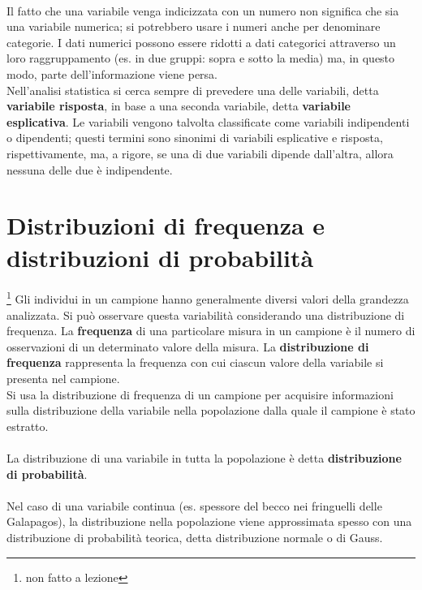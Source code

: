 \documentclass[10pt, draft]{book}
\begin{document}
\\
Il fatto che una variabile venga indicizzata con un numero non significa che sia una variabile numerica; si potrebbero usare i numeri anche per denominare categorie. I dati numerici possono essere ridotti a dati categorici attraverso un loro raggruppamento (es. in due gruppi: sopra e sotto la media) ma, in questo modo, parte dell'informazione viene persa.
\\
Nell'analisi statistica si cerca sempre di prevedere una delle variabili, detta \textbf{variabile risposta}, in base a una seconda variabile, detta \textbf{variabile esplicativa}. Le variabili vengono talvolta classificate come variabili indipendenti o dipendenti; questi termini sono sinonimi di variabili esplicative e risposta, rispettivamente, ma, a rigore, se una di due variabili dipende dall'altra, allora nessuna delle due è indipendente.
\clearpage
\section{Distribuzioni di frequenza e distribuzioni di probabilità}\footnote{non fatto a lezione}
Gli individui in un campione hanno generalmente diversi valori della grandezza analizzata. Si può osservare questa variabilità considerando una distribuzione di frequenza. La \textbf{frequenza} di una particolare misura in un campione è il numero di osservazioni di un determinato valore della misura. La \textbf{distribuzione di frequenza} rappresenta la frequenza con cui ciascun valore della variabile si presenta nel campione.
\\
Si usa la distribuzione di frequenza di un campione per acquisire informazioni sulla distribuzione della variabile nella popolazione dalla quale il campione è stato estratto.
\\
\\
La distribuzione di una variabile in tutta la popolazione è detta \textbf{distribuzione di probabilità}.
\\
\\
Nel caso di una variabile continua (es. spessore del becco nei fringuelli delle Galapagos), la distribuzione nella popolazione viene approssimata spesso con una distribuzione di probabilità teorica, detta distribuzione normale o di Gauss.
\end{document}
